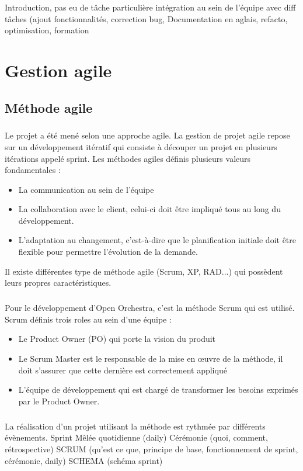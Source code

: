 Introduction, pas eu de tâche particulière intégration au sein de l'équipe avec diff tâches (ajout fonctionnalités, correction bug, Documentation en aglais, refacto, optimisation, formation

\chapter{Gestion agile}
\section{Méthode agile}
\paragraph{}
Le projet a été mené selon une approche agile. La gestion de projet agile repose sur un développement itératif qui consiste à découper un projet en plusieurs itérations appelé sprint. Les méthodes agiles définis plusieurs valeurs fondamentales : 
\begin{itemize}
\item La communication au sein de l'équipe
\item La collaboration avec le client, celui-ci doit être impliqué tous au long du développement.
\item L'adaptation au changement, c'est-à-dire que le planification initiale doit être flexible pour permettre l'évolution de la demande. 
\end{itemize}
Il existe différentes type de méthode agile (Scrum, XP, RAD...) qui possèdent leurs propres caractéristiques.
\paragraph{}
Pour le développement d'Open Orchestra, c'est la méthode Scrum qui est utilisé. Scrum définis trois roles au sein d'une équipe : 
\begin{itemize}
\item  Le \og Product Owner (PO) \fg{} qui porte la vision du produit
\item Le \og Scrum Master \fg{} est le responsable de la mise en œuvre de la méthode, il doit s'assurer que cette dernière est correctement appliqué
\item L'équipe de développement qui est chargé de transformer les besoins exprimés par le Product Owner. 
\end{itemize}
\paragraph{}
La réalisation d'un projet utilisant la méthode est rythmée par différents évènements.
Sprint 
Mêlée quotidienne (daily)
Cérémonie (quoi, comment, rétrospective) 
SCRUM (qu'est ce que, principe de base, fonctionnement de sprint, cérémonie, daily) 
SCHEMA (schéma sprint)
